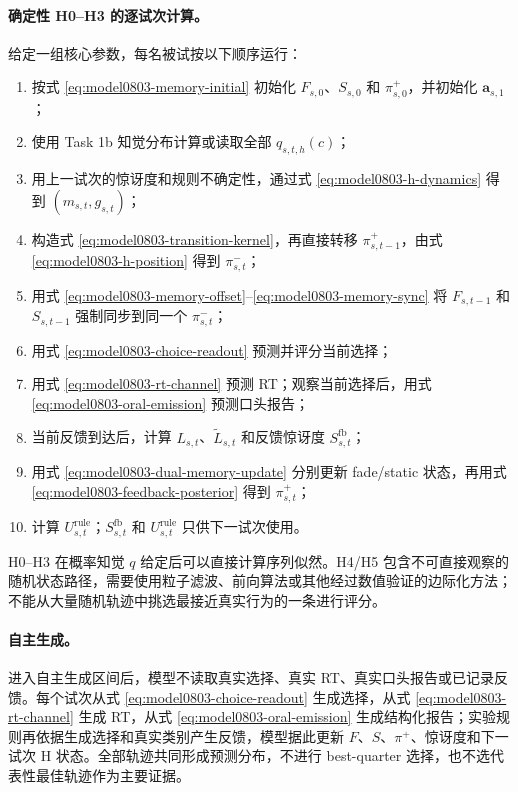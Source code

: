 \paragraph{确定性 H0--H3 的逐试次计算。}
给定一组核心参数，每名被试按以下顺序运行：
\begin{enumerate}
    \item 按式 \ref{eq:model0803-memory-initial} 初始化 $F_{s,0}$、$S_{s,0}$ 和 $\pi^+_{s,0}$，并初始化 $\mathbf a_{s,1}$；
    \item 使用 Task 1b 知觉分布计算或读取全部 $q_{s,t,h}(c)$；
    \item 用上一试次的惊讶度和规则不确定性，通过式 \ref{eq:model0803-h-dynamics} 得到 $(m_{s,t},g_{s,t})$；
    \item 构造式 \ref{eq:model0803-transition-kernel}，再直接转移 $\pi^+_{s,t-1}$，由式 \ref{eq:model0803-h-position} 得到 $\pi^-_{s,t}$；
    \item 用式 \ref{eq:model0803-memory-offset}--\ref{eq:model0803-memory-sync} 将 $F_{s,t-1}$ 和 $S_{s,t-1}$ 强制同步到同一个 $\pi^-_{s,t}$；
    \item 用式 \ref{eq:model0803-choice-readout} 预测并评分当前选择；
    \item 用式 \ref{eq:model0803-rt-channel} 预测 RT；观察当前选择后，用式 \ref{eq:model0803-oral-emission} 预测口头报告；
    \item 当前反馈到达后，计算 $L_{s,t}$、$\widetilde L_{s,t}$ 和反馈惊讶度 $S^{\mathrm{fb}}_{s,t}$；
    \item 用式 \ref{eq:model0803-dual-memory-update} 分别更新 fade/static 状态，再用式 \ref{eq:model0803-feedback-posterior} 得到 $\pi^+_{s,t}$；
    \item 计算 $U^{\mathrm{rule}}_{s,t}$；$S^{\mathrm{fb}}_{s,t}$ 和 $U^{\mathrm{rule}}_{s,t}$ 只供下一试次使用。
\end{enumerate}
H0--H3 在概率知觉 $q$ 给定后可以直接计算序列似然。H4/H5 包含不可直接观察的随机状态路径，需要使用粒子滤波、前向算法或其他经过数值验证的边际化方法；不能从大量随机轨迹中挑选最接近真实行为的一条进行评分。

\paragraph{自主生成。}
进入自主生成区间后，模型不读取真实选择、真实 RT、真实口头报告或已记录反馈。每个试次从式 \ref{eq:model0803-choice-readout} 生成选择，从式 \ref{eq:model0803-rt-channel} 生成 RT，从式 \ref{eq:model0803-oral-emission} 生成结构化报告；实验规则再依据生成选择和真实类别产生反馈，模型据此更新 $F$、$S$、$\pi^+$、惊讶度和下一试次 H 状态。全部轨迹共同形成预测分布，不进行 best-quarter 选择，也不选代表性最佳轨迹作为主要证据。

